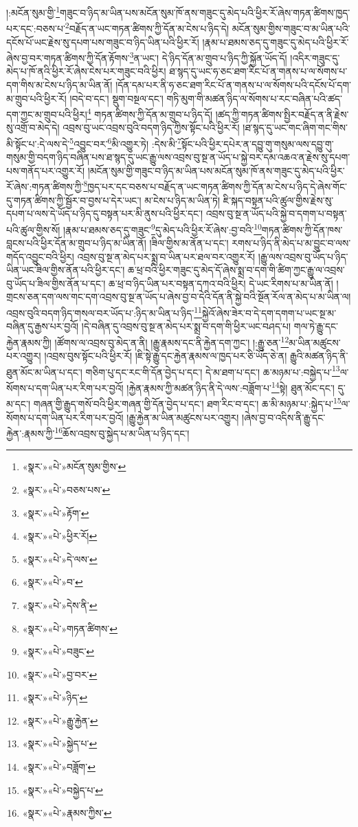 །:མངོན་སུམ་གྱི་\footnote{«སྣར་»«པེ་»མངོན་སུམ་གྱིས་}གཟུང་བ་ཉིད་མ་ཡིན་པས་མངོན་སུམ་ཁོ་ནས་གཟུང་དུ་མེད་པའི་ཕྱིར་རོ་ཞེས་གཏན་ཚིགས་ཁྱད་པར་དང་:བཅས་པ་\footnote{«སྣར་»«པེ་»བཅས་པས་}བརྗོད་ན་ཡང་གཏན་ཚིགས་ཀྱི་དོན་མ་ངེས་པ་ཉིད་དེ། མངོན་སུམ་གྱིས་གཟུང་བ་མ་ཡིན་པའི་དངོས་པོ་ཡང་རྗེས་སུ་དཔག་པས་གཟུང་བ་ཉིད་ཡིན་པའི་ཕྱིར་རོ། །རྣམ་པ་ཐམས་ཅད་དུ་གཟུང་དུ་མེད་པའི་ཕྱིར་རོ་ཞེས་བྱ་བར་གཏན་ཚིགས་ཀྱི་དོན་རྟོགས་\footnote{«སྣར་»«པེ་»རྟོག་}ན་ཡང་། དེ་ཉིད་དོན་མ་གྲུབ་པ་ཉིད་ཀྱི་སྐྱོན་ཡོད་དོ། །འདིར་གཟུང་དུ་མེད་པ་ཁོ་ནའི་ཕྱིར་རོ་ཞེས་ངེས་པར་གཟུང་བའི་ཕྱིར། ཐ་སྙད་དུ་ཡང་ཧ་ཅང་ཐག་རིང་པོ་ན་གནས་པ་ལ་སོགས་པ་དག་གིས་མ་ངེས་པ་ཉིད་མ་ཡིན་ནོ། །དོན་དམ་པར་ནི་ཧ་ཅང་ཐག་རིང་པོ་ན་གནས་པ་ལ་སོགས་པའི་དངོས་པོ་དག་མ་གྲུབ་པའི་ཕྱིར་རོ། །བདེ་བ་དང་། སྡུག་བསྔལ་དང་། གཏི་མུག་གི་མཚན་ཉིད་ལ་སོགས་པ་རང་བཞིན་པའི་ཚད་དག་ཀྱང་མ་གྲུབ་པའི་ཕྱིར།\footnote{«སྣར་»«པེ་»ཕྱིར་རོ།} གཏན་ཚིགས་ཀྱི་དོན་མ་གྲུབ་པ་ཉིད་དོ། །ཚད་ཀྱི་གཏན་ཚིགས་སྤྱིར་བརྗོད་ན་ནི་རྗེས་སུ་འགྲོ་བ་མེད་དེ། འབྲས་བུ་ཡང་འབྲས་བུའི་བདག་ཉིད་ཀྱིས་སྟོང་པའི་ཕྱིར་རོ། །ཐ་སྙད་དུ་ཡང་གང་ཞིག་གང་གིས་མི་སྟོང་པ་:དེ་ལས་དེ་\footnote{«སྣར་»«པེ་»དེ་ལས་}འབྱུང་བར་\footnote{«སྣར་»«པེ་»བ་}མི་འགྱུར་ཏེ། :དེས་མི་\footnote{«སྣར་»«པེ་»དེས་ནི་}སྟོང་པའི་ཕྱིར་དཔེར་ན་དབྱུ་གུ་གསུམ་ལས་དབྱུ་གུ་གསུམ་གྱི་བདག་ཉིད་བཞིན་པས་ཐ་སྙད་དུ་ཡང་རྒྱུ་ལས་འབྲས་བུ་སྔ་ན་ཡོད་པ་སྐྱེ་བར་དམ་འཆའ་ན་རྗེས་སུ་དཔག་པས་གནོད་པར་འགྱུར་རོ། །མངོན་སུམ་གྱི་གཟུང་བ་ཉིད་མ་ཡིན་པས་མངོན་སུམ་ཁོ་ནས་གཟུང་དུ་མེད་པའི་ཕྱིར་རོ་ཞེས་:གཏན་ཚིགས་ཀྱི་\footnote{«སྣར་»«པེ་»གཏན་ཚིགས་}ཁྱད་པར་དང་བཅས་པ་བརྗོད་ན་ཡང་གཏན་ཚིགས་ཀྱི་དོན་མ་ངེས་པ་ཉིད་དེ་ཞེས་གོང་དུ་གཏན་ཚིགས་ཀྱི་སྦྱོར་བ་བྱས་པ་དེར་ཡང་། མ་ངེས་པ་ཉིད་མ་ཡིན་ཏེ། ཇི་སྐད་བསྟན་པའི་ཚུལ་གྱིས་རྗེས་སུ་དཔག་པ་ལས་དེ་ཡོད་པ་ཉིད་དུ་བསྟན་པར་མི་ནུས་པའི་ཕྱིར་དང་། འབྲས་བུ་སྔ་ན་ཡོད་པའི་སྐྱེ་བ་དགག་པ་བསྟན་པའི་ཚུལ་གྱིས་སོ། །རྣམ་པ་ཐམས་ཅད་དུ་གཟུང་\footnote{«སྣར་»«པེ་»བཟུང་}དུ་མེད་པའི་ཕྱིར་རོ་ཞེས་:བྱ་བའི་\footnote{«སྣར་»«པེ་»བྱ་བར་}གཏན་ཚིགས་ཀྱི་དོན་ཁས་བླངས་པའི་ཕྱིར་དོན་མ་གྲུབ་པ་ཉིད་མ་ཡིན་ནོ། །ཟིལ་གྱིས་མ་ནོན་པ་དང་། རགས་པ་ཉིད་ནི་མེད་པ་མ་བྱུང་བ་ལས་གདོད་འབྱུང་བའི་ཕྱིར། འབྲས་བུ་སྔ་ན་མེད་པར་སྨྲ་བ་ཡིན་པར་ཐལ་བར་འགྱུར་རོ། །རྒྱུ་ལས་འབྲས་བུ་ཡོད་པ་ཉིད་ཡིན་ཡང་ཟིལ་གྱིས་ནོན་པའི་ཕྱིར་དང་། ཆ་ཕྲ་བའི་ཕྱིར་གཟུང་དུ་མེད་དོ་ཞེས་སྨྲ་བ་དག་གི་ཚིག་ཀྱང་རྒྱུ་ལ་འབྲས་བུ་ཡོད་པ་ཟིལ་གྱིས་ནོན་པ་དང་། ཆ་ཕྲ་བ་ཉིད་ཡིན་པར་བསྟན་དཀའ་བའི་ཕྱིར། དེ་ཡང་རིགས་པ་མ་ཡིན་ནོ། །གྲངས་ཅན་དག་ལས་གང་དག་འབྲས་བུ་སྔ་ན་ཡོད་པ་ཞེས་བྱ་བ་དེའི་དོན་ནི་སྐྱེ་བའི་སྔོན་རོལ་ན་མེད་པ་མ་ཡིན་ལ། འབྲས་བུའི་བདག་ཉིད་གསལ་བར་ཡོད་པ་:ཉིད་མ་ཡིན་པ་ཉིད་\footnote{«སྣར་»«པེ་»ཉིད་}སྐྱེའོ་ཞེས་ཟེར་བ་དེ་དག་དགག་པ་ཡང་སྔ་མ་བཞིན་དུ་རྒྱས་པར་བྱའོ། །དེ་བཞིན་དུ་འབྲས་བུ་སྔ་ན་མེད་པར་སྨྲ་བ་དག་གི་ཕྱིར་ཡང་བཤད་པ། གལ་ཏེ་རྒྱུ་དང་རྐྱེན་རྣམས་ཀྱི། །ཚོགས་ལ་འབྲས་བུ་མེད་ན་ནི། །རྒྱུ་རྣམས་དང་ནི་རྐྱེན་དག་ཀྱང་། །:རྒྱུ་ཅན་\footnote{«སྣར་»«པེ་»རྒྱུ་རྐྱེན་}མ་ཡིན་མཚུངས་པར་འགྱུར། །འབྲས་བུས་སྟོང་པའི་ཕྱིར་རོ། །ཇི་སྟེ་རྒྱུ་དང་རྐྱེན་རྣམས་ལ་ཁྱད་པར་ཅི་ཡོད་ཅེ་ན། རྒྱུའི་མཚན་ཉིད་ནི་ཐུན་མོང་མ་ཡིན་པ་དང་། གཅིག་པུ་དང་རང་གི་དོན་བྱེད་པ་དང་། དེ་མ་ཐག་པ་དང་། ཆ་མཉམ་པ་:བསྐྱེད་པ་\footnote{«སྣར་»«པེ་»སྐྱེད་པ་}ལ་སོགས་པ་དག་ཡིན་པར་རིག་པར་བྱའོ། །རྐྱེན་རྣམས་ཀྱི་མཚན་ཉིད་ནི་དེ་ལས་:བཟློག་པ་\footnote{«སྣར་»«པེ་»བཟློག་}སྟེ། ཐུན་མོང་དང་། དུ་མ་དང་། གཞན་གྱི་རྒྱུད་གསོ་བའི་ཕྱིར་གཞན་གྱི་དོན་བྱེད་པ་དང་། ཐག་རིང་བ་དང་། ཆ་མི་མཉམ་པ་:སྐྱེད་པ་\footnote{«སྣར་»«པེ་»བསྐྱེད་པ་}ལ་སོགས་པ་དག་ཡིན་པར་རིག་པར་བྱའོ། །རྒྱུ་རྐྱེན་མ་ཡིན་མཚུངས་པར་འགྱུར། །ཞེས་བྱ་བ་འདིས་ནི་རྒྱུ་དང་རྐྱེན་:རྣམས་ཀྱི་\footnote{«སྣར་»«པེ་»རྣམས་ཀྱིས་}ཆོས་འབྲས་བུ་སྐྱེད་པ་མ་ཡིན་པ་ཉིད་དང་། 